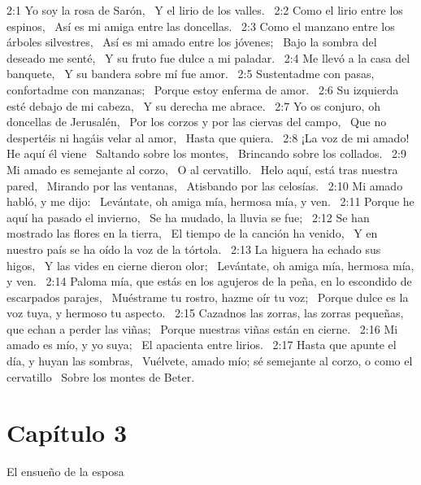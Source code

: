 2:1 Yo soy la rosa de Sarón,  
Y el lirio de los valles.  
2:2 Como el lirio entre los espinos,  
Así es mi amiga entre las doncellas.  
2:3 Como el manzano entre los árboles silvestres,  
Así es mi amado entre los jóvenes;  
Bajo la sombra del deseado me senté,  
Y su fruto fue dulce a mi paladar.  
2:4 Me llevó a la casa del banquete,  
Y su bandera sobre mí fue amor.  
2:5 Sustentadme con pasas, confortadme con manzanas;  
Porque estoy enferma de amor.  
2:6 Su izquierda esté debajo de mi cabeza,  
Y su derecha me abrace.  
2:7 Yo os conjuro, oh doncellas de Jerusalén,  
Por los corzos y por las ciervas del campo,  
Que no despertéis ni hagáis velar al amor,  
Hasta que quiera.  
2:8 ¡La voz de mi amado! He aquí él viene  
Saltando sobre los montes,  
Brincando sobre los collados.  
2:9 Mi amado es semejante al corzo,  
O al cervatillo.  
Helo aquí, está tras nuestra pared,  
Mirando por las ventanas,  
Atisbando por las celosías.  
2:10 Mi amado habló, y me dijo:  
Levántate, oh amiga mía, hermosa mía, y ven.  
2:11 Porque he aquí ha pasado el invierno,  
Se ha mudado, la lluvia se fue;  
2:12 Se han mostrado las flores en la tierra,  
El tiempo de la canción ha venido,  
Y en nuestro país se ha oído la voz de la tórtola.  
2:13 La higuera ha echado sus higos,  
Y las vides en cierne dieron olor;  
Levántate, oh amiga mía, hermosa mía, y ven.  
2:14 Paloma mía, que estás en los agujeros de la peña, en lo escondido de escarpados parajes,  
Muéstrame tu rostro, hazme oír tu voz;  
Porque dulce es la voz tuya, y hermoso tu aspecto.  
2:15 Cazadnos las zorras, las zorras pequeñas, que echan a perder las viñas;  
Porque nuestras viñas están en cierne.  
2:16 Mi amado es mío, y yo suya;  
El apacienta entre lirios.  
2:17 Hasta que apunte el día, y huyan las sombras,  
Vuélvete, amado mío; sé semejante al corzo, o como el cervatillo  
Sobre los montes de Beter. 
\section*{Capítulo 3}
El ensueño de la esposa  

